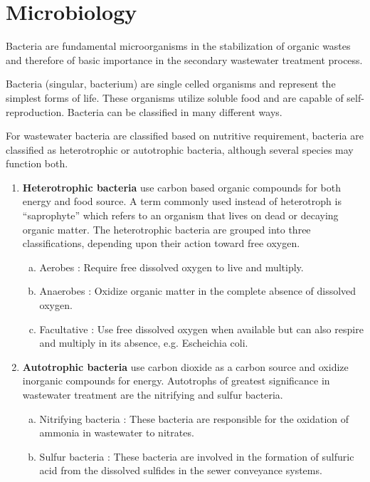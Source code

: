 		\section{Microbiology}
		
Bacteria are fundamental microorganisms in the stabilization of organic wastes and therefore of basic importance in the secondary wastewater treatment process.  

Bacteria (singular, bacterium) are single celled organisms and represent the simplest forms of life.  These organisms utilize soluble food and are capable of self-reproduction.  
Bacteria can be classified in many different ways. 

For wastewater bacteria are classified based on nutritive requirement, bacteria are classified as heterotrophic or autotrophic bacteria, although several species may function both.

\begin{enumerate}[1.]
\item \textbf{Heterotrophic bacteria} use carbon based organic compounds for both energy and food source. A term commonly used instead of heterotroph is “saprophyte” which refers to an organism that lives on dead or decaying organic matter. The heterotrophic bacteria are grouped into three classifications, depending upon their action toward free oxygen.

\begin{enumerate}[a.]
\item
Aerobes : Require free dissolved oxygen to live and multiply. 
\item
Anaerobes : Oxidize organic matter in the complete absence of dissolved oxygen.
\item
Facultative : Use free dissolved oxygen when available but can also respire and multiply in its absence, e.g. Escheichia coli.
\end{enumerate}

\item \textbf{Autotrophic bacteria} use carbon dioxide as a carbon source and oxidize inorganic compounds for energy. Autotrophs of greatest significance in wastewater treatment are the nitrifying and sulfur bacteria.

\begin{enumerate}[a.]
\item Nitrifying bacteria : These bacteria are responsible for the oxidation of ammonia in wastewater to nitrates. 
\item Sulfur bacteria : These bacteria are involved in the formation of sulfuric acid from the dissolved sulfides in the sewer conveyance systems.
\end{enumerate}
\end{enumerate}

